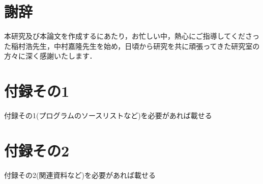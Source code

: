 \documentclass{funthesis}
\begin{document}
\maketitle       %

\tableofcontents








\chapter*{謝辞}
本研究及び本論文を作成するにあたり，お忙しい中，熱心にご指導してくださった稲村浩先生，中村嘉隆先生を始め，日頃から研究を共に頑張ってきた研究室の方々に深く感謝いたします．

\nocite{*}

%
\appendix
\chapter*{付録その1} %
付録その1(プログラムのソースリストなど)を必要があれば載せる
\chapter*{付録その2}
付録その2(関連資料など)を必要があれば載せる
\listoffigures
\listoftables
\end{document}
